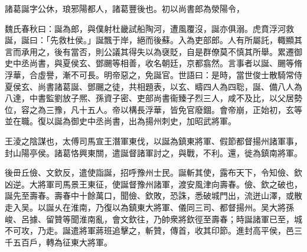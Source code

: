 
\begin{pinyinscope}
諸葛誕字公休，琅邪陽都人，諸葛豐後也。初以尚書郎為滎陽令，

魏氏春秋曰：誕為郎，與僕射杜畿試船陶河，遭風覆沒，誕亦俱溺。虎賁浮河救誕，誕曰：「先救杜侯。」誕飄于岸，絕而後蘇。入為吏部郎。人有所屬託，輙顯其言而承用之，後有當否，則公議其得失以為襃貶，自是群僚莫不慎其所舉。累遷御史中丞尚書，與夏侯玄、鄧颺等相善，收名朝廷，京都翕然。言事者以誕、颺等脩浮華，合虛譽，漸不可長。明帝惡之，免誕官。世語曰：是時，當世俊士散騎常侍夏侯玄、尚書諸葛誕、鄧颺之徒，共相題表，以玄、疇四人為四聡，誕、備八人為八達，中書監劉放子熈、孫資子密、吏部尚書衞臻子烈三人，咸不及比，以父居勢位，容之為三豫，凡十五人。帝以構長浮華，皆免官廢錮。會帝崩，正始初，玄等並在職。復以誕為御史中丞尚書，出為揚州刺史，加昭武將軍。

王淩之陰謀也，太傅司馬宣王潛軍東伐，以誕為鎮東將軍、假節都督揚州諸軍事，封山陽亭侯。諸葛恪興東關，遣誕督諸軍討之，與戰，不利。還，徙為鎮南將軍。

後毌丘儉、文欽反，遣使詣誕，招呼豫州士民。誕斬其使，露布天下，令知儉、欽凶逆。大將軍司馬景王東征，使誕督豫州諸軍，渡安風津向壽春。儉、欽之破也，誕先至壽春。壽春中十餘萬口，聞儉、欽敗，恐誅，悉破城門出，流迸山澤，或散走入吴。以誕乆在淮南，乃復以為鎮東大將軍、儀同三司、都督揚州。吴大將孫峻、呂據、留贊等聞淮南亂，會文欽往，乃帥衆將欽徑至壽春；時誕諸軍已至，城不可攻，乃走。誕遣將軍蔣班追擊之，斬贊，傳首，收其印節。進封高平侯，邑三千五百戶，轉為征東大將軍。


\end{pinyinscope}
